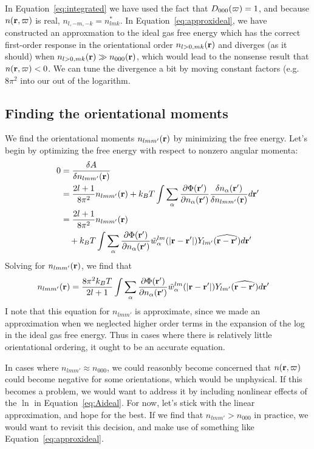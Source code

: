\documentclass[letterpaper,twocolumn,amsmath,amssymb,pre]{revtex4-1}
\begin{document}
In Equation~\ref{eq:integrated} we have used the fact that
$D_{000}(\mathbf{\varpi})=1$, and because $n(\mathbf{r},\mathbf{\varpi})$ is real, $n_{l,-m,-k} =
n_{lmk}^*$.  In Equation~\ref{eq:approxideal}, we have constructed an
approxmation to the ideal gas free energy which has the correct
first-order response in the orientational order $n_{l>0,mk}(\mathbf{r})$ and
diverges (as it should) when $n_{l>0,mk}(\mathbf{r}) \gg n_{000}(\mathbf{r})$, which
would lead to the nonsense result that $n(\mathbf{r},\mathbf{\varpi}) < 0$.  We can tune
the divergence a bit by moving constant factors (e.g. $8\pi^2$ into
our out of the logarithm.

\subsection{Finding the orientational moments}
We find the orientational moments $n_{lmm'}(\mathbf{r})$ by minimizing the
free energy.  Let's begin by optimizing the free energy with respect
to nonzero angular momenta:
\begin{align}
  0&=\frac{\delta A}{\delta n_{lmm'}(\mathbf{r})} \\
  &= \frac{2l+1}{8\pi^2}n_{lmm'}(\mathbf{r})
  + k_BT \int\sum_\alpha
  \frac{\partial \Phi(\mathbf{r}')}{\partial n_\alpha(\mathbf{r}')}
  \frac{\delta n_\alpha(\mathbf{r}')}{\delta n_{lmm'}(\mathbf{r})} d\mathbf{r}'
  \\
  &=
   \frac{2l+1}{8\pi^2}n_{lmm'}(\mathbf{r})
  \\&\quad+ k_BT \int\sum_\alpha
  \frac{\partial \Phi(\mathbf{r}')}{\partial n_\alpha(\mathbf{r}')}
  \tilde{w}_\alpha^{lm}(|\mathbf{r}-\mathbf{r}'|)Y_{lm'}(\widehat{\mathbf{r}-\mathbf{r}'}) d\mathbf{r}'
\end{align}
Solving for $n_{lmm'}(\mathbf{r})$, we find that
\begin{align}\label{eq:nlmm'}
  n_{lmm'}(\mathbf{r}) &= \frac{8\pi^2k_BT}{2l+1}
  \int\sum_\alpha
  \frac{\partial \Phi(\mathbf{r}')}{\partial n_\alpha(\mathbf{r}')}
  \tilde{w}_\alpha^{lm}(|\mathbf{r}-\mathbf{r}'|)Y_{lm'}(\widehat{\mathbf{r}-\mathbf{r}'}) d\mathbf{r}'
\end{align}
I note that this equation for $n_{lmm'}$ is approximate, since we made
an approximation when we neglected higher order terms in the expansion
of the log in the ideal gas free energy.  Thus in cases where there is
relatively little orientational ordering, it ought to be an accurate
equation.

In cases where $n_{lmm'} \approx n_{000}$, we could reasonbly become
concerned that $n(\mathbf{r}, \mathbf{\varpi})$ could become negative for some
orientations, which would be unphysical.  If this becomes a problem,
we would want to address it by including nonlinear effects of the
$\ln$ in Equation~\ref{eq:Aideal}.  For now, let's stick with the
linear approximation, and hope for the best.  If we find that
$n_{lmm'} > n_{000}$ in practice, we would want to revisit this
decision, and make use of something like
Equation~\ref{eq:approxideal}.
\end{document}

